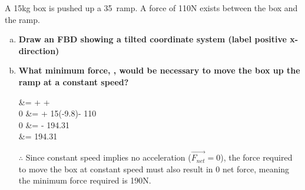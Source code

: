 \documentclass{agony}
\begin{document}
\begin{prob}
	A 15kg box is pushed up a 35\textdegree~ramp.
	A force of 110N exists between the box and the ramp.
	\begin{enumerate}[(a)]
		\item \textbf{Draw an FBD showing a tilted coordinate system (label positive x-direction)}\\
		      \begin{center}
			      
		      \end{center}
		\item \textbf{What minimum force, , would be  necessary to move the box up the ramp at a constant speed?}
		      \begin{solution}
			       &=  +  + \\
			      0 &=  + 15(-9.8)\degree - 110\\
			      0 &=  - 194.31\\
			       &= 194.31
		      \end{solution}
		      $\therefore$ Since constant speed implies no acceleration ($\vec{F_{net}}=0$), the force required to move the box at constant speed must also result in 0 net force, meaning the minimum force required is 190N.
	\end{enumerate}
\end{prob}
\end{document}
